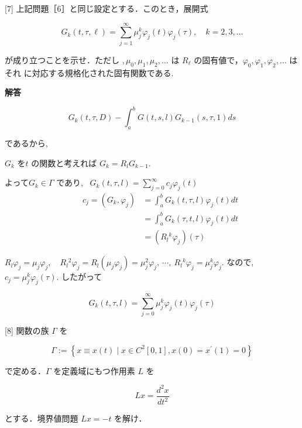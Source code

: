\documentclass{jsarticle}
\begin{document}
\begin{itembox}[l]{[7]}
上記問題［6］と同じ設定とする．このとき，展開式

\begin{equation*}
G_{k}(t, \tau, \ell)=\sum_{j=1}^{\infty} \mu_{j}^{k} \varphi_{j}(t) \varphi_{j}(\tau), \quad k=2,3, \ldots \tag{16}
\end{equation*}


が成り立つことを示せ．ただし $, \mu_{0}, \mu_{1}, \mu_{2}, \ldots$ は $R_{\ell}$ の固有値で，$\varphi_{0}, \varphi_{1}, \varphi_{2}, \ldots$ はそれ に対応する規格化された固有関数である.  
\end{itembox}

\textbf{解答}

$$
G_{k}(t, \tau, D)-\int_{a}^{b} G(t, s, l) G_{k-1}(s, \tau, 1) d s
$$

であるから, \ 

$G_{k}$ を$t$ の関数と考えれば
$G_k = R_l G_{k-1}$.

よって$G_k \in \Gamma$ であり, \ $G_k(t,\tau,l) = \displaystyle \sum_{j=0}^{\infty} c_j \varphi_j(t)$
$$
\begin{aligned}
\qquad c_{j}=\left(G_{k}, \varphi_{j}\right)
&=\int_{a}^{b} G_{k}(t, \tau, l) \varphi_{j}(t) d t\\
&=\int_{a}^{b} G_{k}(\tau, t, l) \varphi_{j}(t) d t\\
&=\left(R_{l}{ }^{k} \varphi_{j}\right)(\tau)
\end{aligned}
$$

$R_{l} \varphi_{j}=\mu_{j} \varphi_{j}, \quad R_{l}{ }^{2} \varphi_{j}=R_{l}\left(\mu_{j} \varphi_{j}\right)=\mu_{j}^{2} \varphi_{j}, \ \cdots, \ R_{l}{ }^{k} \varphi_{j}=\mu_{j}^{k} \varphi_{j}$.
なので, \ $c_j = \mu_j^k \varphi_j (\tau)$. したがって

$$
G_{k}(t, \tau, l)=\sum_{j=0}^{\infty} \mu_{j}^{k} \varphi_j(t) \varphi_{j}(\tau)
$$

\bigskip
\bigskip

\begin{itembox}[l]{[8]}
関数の族 $\Gamma$ を


\begin{equation*}
\Gamma:=\left\{x \equiv x(t) \mid x \in C^{2}[0,1], x(0)=x^{\prime}(1)=0\right\} \tag{17}
\end{equation*}


で定める．$\Gamma$ を定義域にもつ作用素 $L$ を


\begin{equation*}
L x=\frac{d^{2} x}{d t^{2}} \tag{18}
\end{equation*}


とする．境界値問題 $L x=-t$ を解け．  
\end{itembox}
\end{document}
